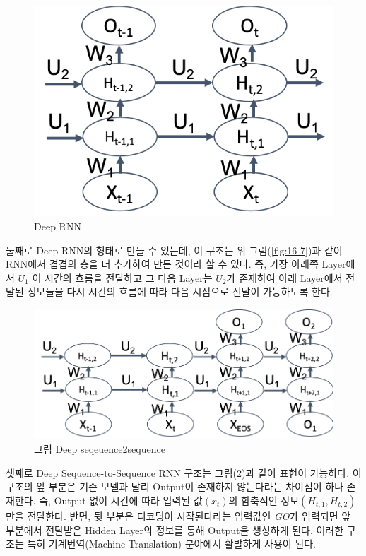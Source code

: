 \documentclass[draft=false]{oblivoir}
\begin{document}
\begin{figure}[ht] \centering 
  \includegraphics[scale=0.7]{fig9.png}
  \caption{Deep RNN}
  \label{fig:16-9}
\end{figure}

둘째로 Deep RNN의 형태로 만들 수 있는데, 이 구조는 위 그림(\ref{fig:16-7})과 같이 RNN에서 겹겹의 층을 더 추가하여 만든 것이라 할 수 있다. 즉, 가장 아래쪽 Layer에서 $U_1$ 이 시간의 흐름을 전달하고 그 다음 Layer는 $U_2$가 존재하여 아래 Layer에서 전달된 정보들을 다시 시간의 흐름에 따라 다음 시점으로 전달이 가능하도록 한다. \par

\begin{figure}[ht] \centering 
  \includegraphics[scale=0.7]{fig10.png}
  \caption{그림 Deep seqeuence2sequence}
  \label{fig:16-10}
\end{figure}

셋째로 Deep Sequence-to-Sequence RNN 구조는 그림(\ref{fig:16-10})과 같이 표현이 가능하다. 이 구조의 앞 부분은 기존 모델과 달리 Output이 존재하지 않는다라는 차이점이 하나 존재한다. 즉, Output 없이 시간에 따라 입력된 값$(x_t)$의 함축적인 정보$(H_{t,1}, H_{t,2})$만을 전달한다. 반면, 뒷 부분은 디코딩이 시작된다라는 입력값인  \textit{GO}가 입력되면 앞 부분에서 전달받은 Hidden Layer의 정보를 통해 Output을 생성하게 된다. 이러한 구조는 특히 기계번역(Machine Translation) 분야에서 활발하게 사용이 된다. 
\end{document}
